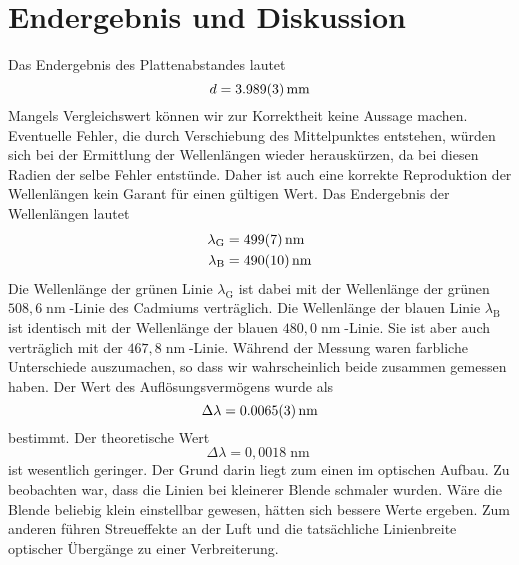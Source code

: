 \documentclass[a4paper,german,12pt,smallheadings]{scrartcl}
\begin{document}
\section{Endergebnis und Diskussion}
Das Endergebnis des Plattenabstandes lautet
\begin{equation}
d = \num{3.989+-0.003} \operatorname{mm}
\end{equation}
Mangels Vergleichswert können wir zur Korrektheit keine Aussage machen.
Eventuelle Fehler, die durch Verschiebung des Mittelpunktes entstehen, würden
sich bei der Ermittlung der Wellenlängen wieder herauskürzen, da bei diesen
Radien der selbe Fehler entstünde. Daher ist auch eine korrekte Reproduktion
der Wellenlängen kein Garant für einen gültigen Wert.
Das Endergebnis der Wellenlängen lautet
\begin{align*}
\lambda_\text{G} &= \num{499+-7} \operatorname{nm} \\
\lambda_\text{B} &= \num{490+-10} \operatorname{nm}
\end{align*}
Die Wellenlänge der grünen Linie $\lambda_\text{G}$ ist dabei mit der
Wellenlänge der grünen $508{,}6 \operatorname{nm}$-Linie des Cadmiums
verträglich.
Die Wellenlänge der blauen Linie $\lambda_\text{B}$ ist identisch mit der
Wellenlänge der blauen $480{,}0 \operatorname{nm}$-Linie. Sie ist aber auch
verträglich mit der $467{,}8 \operatorname{nm}$-Linie. Während der Messung
waren farbliche Unterschiede auszumachen, so dass wir
wahrscheinlich beide zusammen gemessen haben.
Der Wert des Auflösungsvermögens wurde als
\begin{equation}
\Delta \lambda = \num{0.0065\pm0.0003} \operatorname{nm}
\end{equation}
bestimmt.
Der theoretische Wert
\begin{equation}
\Delta \lambda = 0{,}0018 \operatorname{nm}
\end{equation}
ist wesentlich geringer.
Der Grund darin liegt zum einen im optischen Aufbau. Zu beobachten war, dass
die Linien bei kleinerer Blende schmaler wurden. Wäre die Blende beliebig klein
einstellbar gewesen, hätten sich bessere Werte ergeben. Zum anderen führen
Streueffekte an der Luft und die tatsächliche Linienbreite optischer Übergänge
zu einer Verbreiterung.
\end{document}
